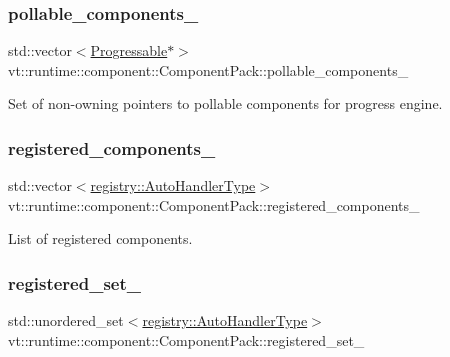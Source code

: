 \subsubsection{\texorpdfstring{pollable\+\_\+components\+\_\+}{pollable\_components\_}}
{\footnotesize\ttfamily std\+::vector$<$\hyperlink{structvt_1_1runtime_1_1component_1_1_progressable}{Progressable}$\ast$$>$ vt\+::runtime\+::component\+::\+Component\+Pack\+::pollable\+\_\+components\+\_\+\hspace{0.3cm}{\ttfamily [private]}}



Set of non-\/owning pointers to pollable components for progress engine. 

\mbox{\label{structvt_1_1runtime_1_1component_1_1_component_pack_a615b981d265458c952406691c89ce0f6}} 
\subsubsection{\texorpdfstring{registered\+\_\+components\+\_\+}{registered\_components\_}}
{\footnotesize\ttfamily std\+::vector$<$\hyperlink{namespacevt_1_1runtime_1_1component_1_1registry_a9b86518797c7bb91babf0ca8ee7d06e6}{registry\+::\+Auto\+Handler\+Type}$>$ vt\+::runtime\+::component\+::\+Component\+Pack\+::registered\+\_\+components\+\_\+\hspace{0.3cm}{\ttfamily [private]}}



List of registered components. 

\mbox{\label{structvt_1_1runtime_1_1component_1_1_component_pack_a7dd24ee6d0e1a8e66dd35257ba3e6d75}} 
\subsubsection{\texorpdfstring{registered\+\_\+set\+\_\+}{registered\_set\_}}
{\footnotesize\ttfamily std\+::unordered\+\_\+set$<$\hyperlink{namespacevt_1_1runtime_1_1component_1_1registry_a9b86518797c7bb91babf0ca8ee7d06e6}{registry\+::\+Auto\+Handler\+Type}$>$ vt\+::runtime\+::component\+::\+Component\+Pack\+::registered\+\_\+set\+\_\+\hspace{0.3cm}{\ttfamily [private]}}



